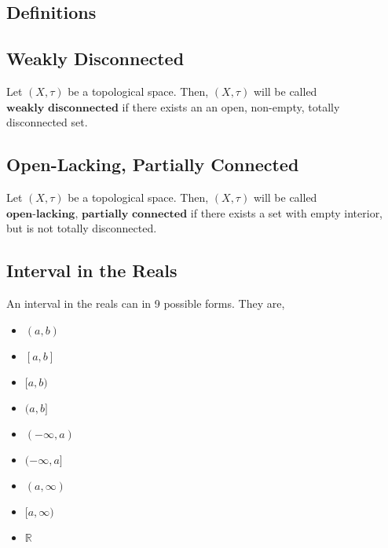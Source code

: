 \documentclass{article}
\author{Mehdi Drissi}
\date{}
\begin{document}
\maketitle
\newpage

\tableofcontents
\newpage

\begin{center}
\section{Definitions}
\end{center}

\subsection{Weakly Disconnected}
Let $(X,\tau)$ be a topological space. Then, $(X,\tau)$ will be called $\textbf{weakly disconnected}$ if there exists an an open, non-empty, totally disconnected set.\\

\subsection{Open-Lacking, Partially Connected}
Let $(X, \tau)$ be a topological space. Then, $(X, \tau)$ will be called $\textbf{open-lacking, partially connected}$ if there exists a set with empty interior, but is not totally disconnected.\\


\subsection{Interval in the Reals}
An interval in the reals can in 9 possible forms. They are,\\

\begin{itemize}
\item $(a,b)$
\item $[a,b]$
\item $[a,b)$
\item $(a,b]$
\item $(-\infty,a)$
\item $(-\infty,a]$
\item $(a,\infty)$
\item $[a,\infty)$
\item $\mathbb{R}$
\end{itemize}


\newpage
\end{document}

